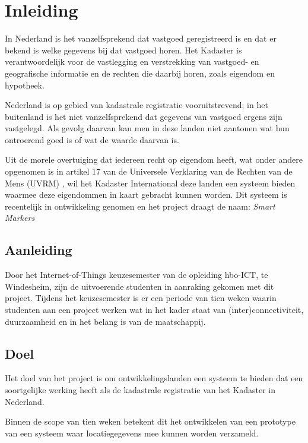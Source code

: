 \section{Inleiding}
In Nederland is het vanzelfsprekend dat vastgoed geregistreerd is en dat er bekend
is welke gegevens bij dat vastgoed horen. Het Kadaster is verantwoordelijk voor de
vastlegging en verstrekking van vastgoed- en geografische informatie en de rechten
die daarbij horen, zoals eigendom en hypotheek. \citep{KAD_OVER}

Nederland is op gebied van kadastrale registratie vooruitstrevend; in het buitenland
is het niet vanzelfsprekend dat gegevens van vastgoed ergens zijn vastgelegd.
Als gevolg daarvan kan men in deze landen niet aantonen wat hun ontroerend goed is
of wat de waarde daarvan is.

Uit de morele overtuiging dat iedereen recht op eigendom heeft, wat onder andere
opgenomen is in artikel 17 van de Universele Verklaring van de Rechten van
de Mens (UVRM) \citep{UN_UDHR}, wil het Kadaster International deze landen een systeem bieden waarmee
deze eigendommen in kaart gebracht kunnen worden. Dit systeem is recentelijk in
ontwikkeling genomen en het project draagt de naam: \textit{Smart Markers}

\subsection{Aanleiding}
Door het Internet-of-Things keuzesemester van de opleiding hbo-ICT, te Windesheim,
zijn de uitvoerende studenten in aanraking gekomen met dit project. Tijdens het
keuzesemester is er een periode van tien weken waarin studenten aan een project
werken wat in het kader staat van (inter)connectiviteit, duurzaamheid en in het
belang is van de maatschappij.

\subsection{Doel}
Het doel van het project is om ontwikkelingslanden een systeem te bieden dat
een soortgelijke werking heeft als de kadastrale registratie van het Kadaster
in Nederland.

Binnen de scope van tien weken betekent dit het ontwikkelen van een prototype
van een systeem waar locatiegegevens mee kunnen worden verzameld.

\citep{KBS_PLAN}